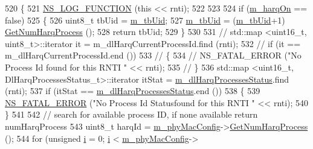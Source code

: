 \begin{DoxyCode}
520 \{
521         \hyperlink{log-macros-disabled_8h_a90b90d5bad1f39cb1b64923ea94c0761}{NS\_LOG\_FUNCTION} (\textcolor{keyword}{this} << rnti);
522 
523 
524         \textcolor{keywordflow}{if} (\hyperlink{classns3_1_1MmWaveFlexTtiMacScheduler_a832729b006315bb770e9f50c16305118}{m\_harqOn} == \textcolor{keyword}{false})
525         \{
526                 uint8\_t tbUid = \hyperlink{classns3_1_1MmWaveFlexTtiMacScheduler_a6164b3a4d99c83b291b54104a29ecaad}{m\_tbUid};
527                 \hyperlink{classns3_1_1MmWaveFlexTtiMacScheduler_a6164b3a4d99c83b291b54104a29ecaad}{m\_tbUid} = (\hyperlink{classns3_1_1MmWaveFlexTtiMacScheduler_a6164b3a4d99c83b291b54104a29ecaad}{m\_tbUid}+1) %
      \hyperlink{classns3_1_1MmWavePhyMacCommon_a40773d84172ebeb5aff125f56ebcc5ac}{GetNumHarqProcess} ();
528                 \textcolor{keywordflow}{return} tbUid;
529         \}
530 
531 \textcolor{comment}{//      std::map <uint16\_t, uint8\_t>::iterator it = m\_dlHarqCurrentProcessId.find (rnti);}
532 \textcolor{comment}{//      if (it == m\_dlHarqCurrentProcessId.end ())}
533 \textcolor{comment}{//      \{}
534 \textcolor{comment}{//              NS\_FATAL\_ERROR ("No Process Id found for this RNTI " << rnti);}
535 \textcolor{comment}{//      \}}
536         std::map <uint16\_t, DlHarqProcessesStatus\_t>::iterator itStat = 
      \hyperlink{classns3_1_1MmWaveFlexTtiMacScheduler_a7ea48669590368853d16240acf7dbebe}{m\_dlHarqProcessesStatus}.find (rnti);
537         \textcolor{keywordflow}{if} (itStat == \hyperlink{classns3_1_1MmWaveFlexTtiMacScheduler_a7ea48669590368853d16240acf7dbebe}{m\_dlHarqProcessesStatus}.end ())
538         \{
539                 \hyperlink{group__fatal_ga5131d5e3f75d7d4cbfd706ac456fdc85}{NS\_FATAL\_ERROR} (\textcolor{stringliteral}{"No Process Id Statusfound for this RNTI "} << rnti);
540         \}
541 
542         \textcolor{comment}{// search for available process ID, if none available return numHarqProcess}
543         uint8\_t harqId = \hyperlink{classns3_1_1MmWaveMacScheduler_a24d7af4971d2e500fe543cefbafa2fd9}{m\_phyMacConfig}->\hyperlink{classns3_1_1MmWavePhyMacCommon_a40773d84172ebeb5aff125f56ebcc5ac}{GetNumHarqProcess} ();
544         \textcolor{keywordflow}{for} (\textcolor{keywordtype}{unsigned} \hyperlink{bernuolliDistribution_8m_a6f6ccfcf58b31cb6412107d9d5281426}{i} = 0; \hyperlink{bernuolliDistribution_8m_a6f6ccfcf58b31cb6412107d9d5281426}{i} < \hyperlink{classns3_1_1MmWaveMacScheduler_a24d7af4971d2e500fe543cefbafa2fd9}{m\_phyMacConfig}->

\end{DoxyCode}
